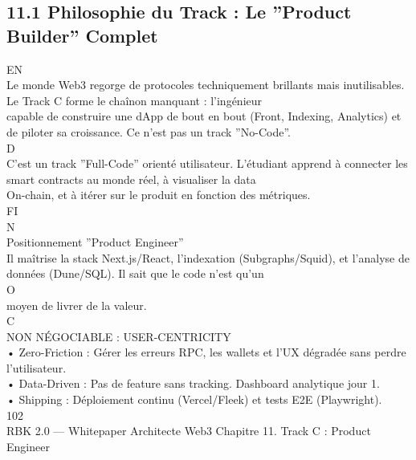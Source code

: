 \subsection{11.1 Philosophie du Track : Le ”Product Builder” Complet}
\vspace{0.5em}
\vspace{0.5em}
\vspace{0.5em}
\vspace{0.5em}
EN\\
Le monde Web3 regorge de protocoles techniquement brillants mais inutilisables. Le Track C forme le chaînon manquant : l’ingénieur\\
capable de construire une dApp de bout en bout (Front, Indexing, Analytics) et de piloter sa croissance. Ce n’est pas un track ”No-Code”.\\
\vspace{0.5em}
\vspace{0.5em}
\vspace{0.5em}
\vspace{0.5em}
D\\
C’est un track ”Full-Code” orienté utilisateur. L’étudiant apprend à connecter les smart contracts au monde réel, à visualiser la data\\
On-chain, et à itérer sur le produit en fonction des métriques.\\
\vspace{0.5em}
\vspace{0.5em}
FI\\
N\\
Positionnement ”Product Engineer”\\
Il maîtrise la stack Next.js/React, l’indexation (Subgraphs/Squid), et l’analyse de données (Dune/SQL). Il sait que le code n’est qu’un\\
O\\
\vspace{0.5em}
moyen de livrer de la valeur.\\
C\\
\vspace{0.5em}
\vspace{0.5em}
NON NÉGOCIABLE : USER-CENTRICITY\\
• Zero-Friction : Gérer les erreurs RPC, les wallets et l’UX dégradée sans perdre l’utilisateur.\\
\vspace{0.5em}
• Data-Driven : Pas de feature sans tracking. Dashboard analytique jour 1.\\
\vspace{0.5em}
• Shipping : Déploiement continu (Vercel/Fleek) et tests E2E (Playwright).\\
\vspace{0.5em}
\vspace{0.5em}
\vspace{0.5em}
102\\
RBK 2.0 — Whitepaper Architecte Web3                                                                Chapitre 11. Track C : Product Engineer\\
\vspace{0.5em}
\vspace{0.5em}
\vspace{0.5em}
